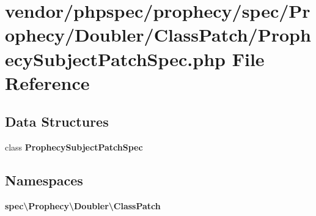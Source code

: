 \section{vendor/phpspec/prophecy/spec/\+Prophecy/\+Doubler/\+Class\+Patch/\+Prophecy\+Subject\+Patch\+Spec.php File Reference}
\label{_prophecy_subject_patch_spec_8php}
\subsection*{Data Structures}
\begin{DoxyCompactItemize}
\item 
class {\bf Prophecy\+Subject\+Patch\+Spec}
\end{DoxyCompactItemize}
\subsection*{Namespaces}
\begin{DoxyCompactItemize}
\item 
 {\bf spec\textbackslash{}\+Prophecy\textbackslash{}\+Doubler\textbackslash{}\+Class\+Patch}
\end{DoxyCompactItemize}
